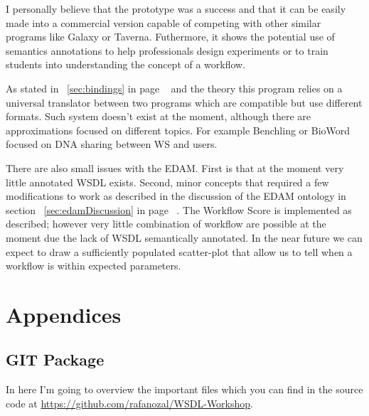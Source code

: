 \documentclass[a4paper,10pt]{article}
\begin{document}
  I personally believe that the prototype was a success and that it can be easily made into a commercial version capable of competing with other similar programs like Galaxy or Taverna. Futhermore, it shows the potential use of semantics annotations to help professionals design experiments or to train students into understanding the concept of a workflow.\vspace{3 mm}

  As stated in ~\ref{sec:bindings} in page ~\pageref{sec:bindings} and  the theory this program relies on a universal translator between two programs which are compatible but use different formats. Such system doesn't exist at the moment, although there are approximations focused on different topics. For example Benchling \cite{benchling} or BioWord \cite{PubMed_22676326} focused on DNA sharing between WS and users. \vspace{3 mm}

  There are also small issues with the EDAM. First is that at the moment very little annotated WSDL exists. Second, minor concepts that required a few modifications to work as described in the discussion of the EDAM ontology in section ~\ref{sec:edamDiscussion} in page ~\pageref{sec:edamDiscussion}. The Workflow Score is implemented as described; however very little combination of workflow are possible at the moment due the lack of WSDL semantically annotated. In the near future we can expect to draw a sufficiently populated scatter-plot that allow us to tell when a workflow is within expected parameters.

\newpage

\section{Appendices}

\subsection{GIT Package}

  In here I'm going to overview the important files which you can find in the source code at \url{ https://github.com/rafanozal/WSDL-Workshop}.
\end{document}
